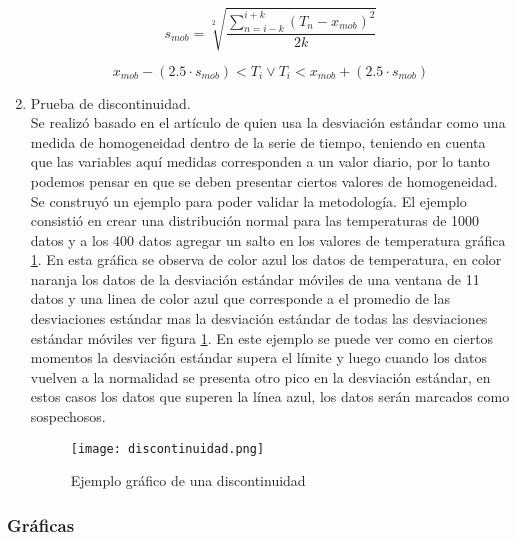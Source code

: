 \documentclass[11pt]{article}
\begin{document}
\begin{enumerate}
\begin{equation}\label{eq:desv-mobil}
s_{mob} = \sqrt[2]{\frac{\sum\limits_{n=i-k}^{i+k} (T_{n} - x_{mob})^2}{2k}} 
\end{equation}
 
\begin{equation}\label{eq:spikes}
	     x_{mob} - (2.5\cdot{s_{mob}}) < T_{i} \lor T_{i} < x_{mob} + (2.5\cdot{s_{mob}}) 
\end{equation}

\item Prueba de discontinuidad.\\
Se realizó basado en el artículo de \citet{roggero2012} quien usa la desviación estándar como una medida de homogeneidad dentro de la serie de tiempo, teniendo en cuenta que las variables aquí medidas corresponden a un valor diario, por lo tanto podemos pensar en que se deben presentar ciertos valores de homogeneidad.\\

Se construyó un ejemplo para poder validar la metodología. El ejemplo consistió en crear una distribución normal para las temperaturas de 1000 datos y a los 400 datos agregar un salto en los valores de temperatura gráfica \ref{subfig:discontinuidad}. En esta gráfica se observa de color azul los datos de temperatura, en color naranja los datos de la desviación estándar móviles de una ventana de 11 datos y una linea de color azul que corresponde a el promedio de las desviaciones estándar mas la desviación estándar de todas las desviaciones estándar móviles ver figura \ref{subfig:discontinuidad}. En este ejemplo se puede ver como en ciertos momentos la desviación estándar supera el límite y luego cuando los datos vuelven a la normalidad se presenta otro pico en la desviación estándar, en estos casos los datos que superen la línea azul, los datos serán marcados como sospechosos.

\begin{figure}[H]
	\begin{center}
	\texttt{[image: discontinuidad.png]}
		\caption{Ejemplo gráfico de una discontinuidad}
		\label{subfig:discontinuidad}	
	\end{center}

\end{figure}

\end{enumerate}

\subsubsection{Gráficas}
\end{document}
